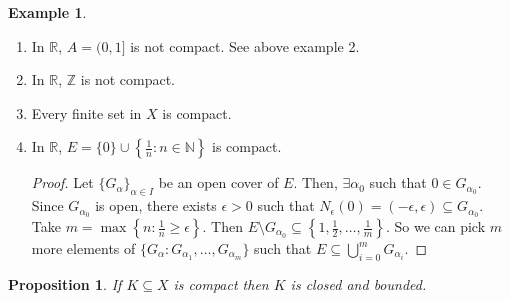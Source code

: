 \documentclass[12pt]{article}
\newtheorem{proposition}[theorem]{Proposition}
\theoremstyle{definition}
\newtheorem{example}[theorem]{Example}
\theoremstyle{remark}
\begin{document}
\begin{example}
    \hfill
    \begin{enumerate}
        \item In $\mathbb{R}$, $A = (0, 1]$ is not compact. See above example 2.
        \item In $\mathbb{R}$, $\mathbb{Z}$ is not compact.
        \item Every finite set in $X$ is compact.
        \item In $\mathbb{R}$, $E = \{0\} \cup \left\{\frac{1}{n} \colon n \in \mathbb{N}\right\}$ is compact.
            \begin{proof}
                Let $\{G_\alpha\}_{\alpha \in I}$ be an open cover of $E$.
                Then, $\exists \alpha_0$ such that $0 \in G_{\alpha_0}$.
                Since $G_{\alpha_0}$ is open, there exists $\epsilon >0$ such that $N_\epsilon(0) = (-\epsilon, \epsilon) \subseteq G_{\alpha_0}$.
                Take $m = \max\left\{n \colon \frac{1}{n} \geq \epsilon\right\}$.
                Then $E \setminus G_{\alpha_0} \subseteq \left\{1, \frac{1}{2}, \ldots, \frac{1}{m}\right\}$.
                So we can pick $m$ more elements of $\{G_\alpha \colon G_{\alpha_1}, \ldots, G_{\alpha_m}\}$ such that
                $E \subseteq \bigcup_{i=0}^m G_{\alpha_i}$.
            \end{proof}
    \end{enumerate}
\end{example}
\begin{proposition}
    If $K \subseteq X$ is compact then $K$ is closed and bounded.
\end{proposition}
\end{document}
